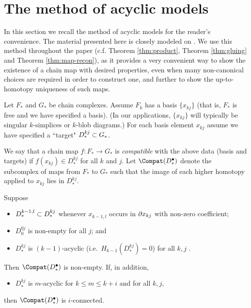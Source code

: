 
\section{The method of acyclic models}  \label{sec:moam}

In this section we recall the method of acyclic models for the reader's convenience. The material presented here is closely modeled on  \cite[Chapter 4]{MR0210112}.
We use this method throughout the paper (c.f. Theorem \ref{thm:product}, Theorem \ref{thm:gluing} and Theorem \ref{thm:map-recon}), as it provides a very convenient way to show the existence of a chain map with desired properties, even when many non-canonical choices are required in order to construct one, and further to show the up-to-homotopy uniqueness of such maps.

Let $F_*$ and $G_*$ be chain complexes.
Assume $F_k$ has a basis $\{x_{kj}\}$
(that is, $F_*$ is free and we have specified a basis).
(In our applications, $\{x_{kj}\}$ will typically be singular $k$-simplices or 
$k$-blob diagrams.)
For each basis element $x_{kj}$ assume we have specified a ``target" $D^{kj}_*\subset G_*$.

We say that a chain map $f:F_*\to G_*$ is {\it compatible} with the above data (basis and targets)
if $f(x_{kj})\in D^{kj}_*$ for all $k$ and $j$.
Let $\Compat(D^\bullet_*)$ denote the subcomplex of maps from $F_*$ to $G_*$
such that the image of each higher homotopy applied to $x_{kj}$ lies in $D^{kj}_*$.

\begin{thm}  \label{moam-thm}
Suppose 
\begin{itemize}
\item $D^{k-1,l}_* \subset D^{kj}_*$ whenever $x_{k-1,l}$ occurs in $\partial x_{kj}$
with non-zero coefficient;
\item $D^{0j}_0$ is non-empty for all $j$; and
\item $D^{kj}_*$ is $(k{-}1)$-acyclic (i.e.\ $H_{k-1}(D^{kj}_*) = 0$) for all $k,j$ .
\end{itemize}
Then $\Compat(D^\bullet_*)$ is non-empty.
If, in addition,
\begin{itemize}
\item $D^{kj}_*$ is $m$-acyclic for $k\le m \le k+i$ and for all $k,j$,
\end{itemize}
then $\Compat(D^\bullet_*)$ is $i$-connected.
\end{thm}

